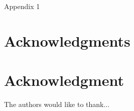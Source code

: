 \documentclass[13pt,journal,compsoc,onecolumn]{IEEEtran}
\begin{document}
%


\appendices

\section{}
Appendix 1


\ifCLASSOPTIONcompsoc
  \section*{Acknowledgments}
\else
  \section*{Acknowledgment}
\fi


The authors would like to thank...


\ifCLASSOPTIONcaptionsoff
  \newpage
\fi




\end{document}
